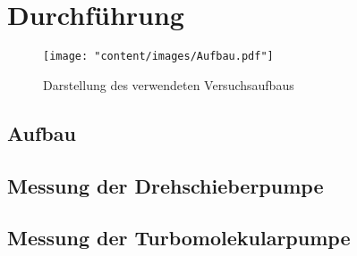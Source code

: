\section{Durchführung}
\label{sec:Durchführung}
\begin{figure}[h]
    \centering
    \texttt{[image: "content/images/Aufbau.pdf"]}
    \caption{Darstellung des verwendeten Versuchsaufbaus}
\label{fig:aufbau}
\end{figure}

\subsection{Aufbau}
\label{sec:aufbau}

\subsection{Messung der Drehschieberpumpe}
\label{sec:messungDreh}

\subsection{Messung der Turbomolekularpumpe}
\label{sec:messungTurbo}